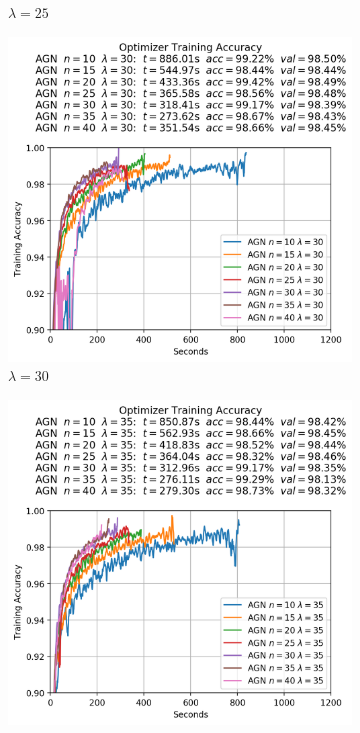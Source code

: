 \begin{figure}
\begin{subfigure}{.3\textwidth}
    \caption{$\lambda = 25$}
  \end{subfigure}
  \begin{subfigure}{.3\textwidth}
    \centering
    \includegraphics[width=\linewidth]{resources/images/agn_experiments_lambda_30}
    \caption{$\lambda = 30$}
  \end{subfigure}
  \begin{subfigure}{.3\textwidth}
    \centering
    \includegraphics[width=\linewidth]{resources/images/agn_experiments_lambda_35}

\end{subfigure}
\end{figure}
